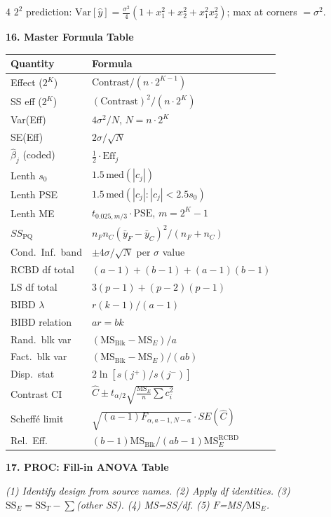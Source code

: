 \documentclass[7pt,letterpaper,landscape]{extarticle}
\newcommand{\secbar}[1]{%
  \vspace{2pt}%
  {\colorbox{black!80}{\parbox{\dimexpr\linewidth-2\fboxsep}{\color{white}\small\bfseries #1}}}\par%
  \vspace{1pt}%
}
\newcommand{\MSE}{\mathrm{MS}_E}
\newcommand{\SSE}{\mathrm{SS}_E}
\newcommand{\SST}{\mathrm{SS}_T}
\begin{document}
\begin{multicols*}{4}
$2^2$ prediction: $\mathrm{Var}[\hat y]{=}\tfrac{\sigma^2}{4}(1{+}x_1^2{+}x_2^2{+}x_1^2x_2^2)$; max at corners $=\sigma^2$.

\secbar{16. Master Formula Table}
{\scriptsize
\begin{tabularx}{\linewidth}{@{}lX@{}}
\toprule
Quantity & Formula\\
\midrule
Effect ($2^K$) & $\text{Contrast}/(n\cdot 2^{K-1})$\\
SS eff ($2^K$) & $(\text{Contrast})^2/(n\cdot 2^K)$\\
Var(Eff) & $4\sigma^2/N$, $N{=}n\cdot 2^K$\\
SE(Eff) & $2\sigma/\sqrt N$\\
$\hat\beta_j$ (coded) & $\tfrac12\cdot\text{Eff}_j$\\
Lenth $s_0$ & $1.5\,\mathrm{med}(|c_j|)$\\
Lenth PSE & $1.5\,\mathrm{med}(|c_j|{:}|c_j|{<}2.5s_0)$\\
Lenth ME & $t_{0.025,m/3}\cdot\text{PSE}$, $m{=}2^K-1$\\
$SS_{\text{PQ}}$ & $n_Fn_C(\bar y_F{-}\bar y_C)^2/(n_F{+}n_C)$\\
Cond.\ Inf.\ band & $\pm4\sigma/\sqrt{N}$ per $\sigma$ value\\
RCBD df total & $(a{-}1){+}(b{-}1){+}(a{-}1)(b{-}1)$\\
LS df total & $3(p{-}1){+}(p{-}2)(p{-}1)$\\
BIBD $\lambda$ & $r(k{-}1)/(a{-}1)$\\
BIBD relation & $ar{=}bk$\\
Rand.\ blk var & $(\mathrm{MS}_{\text{Blk}}{-}\MSE)/a$\\
Fact.\ blk var & $(\mathrm{MS}_{\text{Blk}}{-}\MSE)/(ab)$\\
Disp.\ stat & $2\ln[s(j^+)/s(j^-)]$\\
Contrast CI & $\hat C\pm t_{\alpha/2}\sqrt{\tfrac{\MSE}{n}\sum c_i^2}$\\
Scheffé limit & $\sqrt{(a{-}1)F_{\alpha,a-1,N-a}}\cdot SE(\hat C)$\\
Rel.\ Eff. & $(b{-}1)\mathrm{MS}_{\text{Blk}}/(ab{-}1)\MSE^{\text{RCBD}}$\\
\bottomrule
\end{tabularx}\par}

\secbar{17. PROC: Fill-in ANOVA Table}
\textit{(1) Identify design from source names. (2) Apply df identities. (3) $\SSE{=}\SST{-}\sum$(other SS). (4) MS=SS/df. (5) $F$=MS/$\MSE$.}


\end{multicols*}
\end{document}
